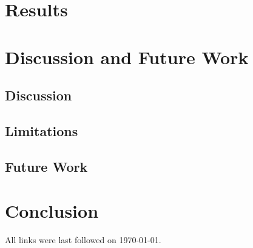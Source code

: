 \documentclass[
  a4paper,  %
  twoside,  %
  bibliography=totoc,
  headsepline,
  cleardoublepage=empty,
  parskip=half,
  draft=false
]{scrbook}
\begin{document}
\chapter{Results}

\chapter{Discussion and Future Work}
\section{Discussion}
\section{Limitations}
\section{Future Work}

\chapter{Conclusion}


\printbibliography

All links were last followed on \today.

\appendix
%

\pagestyle{empty}
\renewcommand*{\chapterpagestyle}{empty}
\Affirmation
\end{document}
